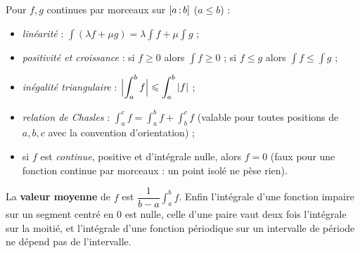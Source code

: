 \begin{theoreme}
Pour $f,g$ continues par morceaux sur $\mathopen{[}a\,{;}\,b\mathclose{]}$ ($a\leqslant b$) :
\begin{itemize}[label={\color{otNavy}\textbullet},leftmargin=1.4em,itemsep=0.6mm,topsep=0.8mm]
  \item \emph{linéarité} :
    $\int(\lambda f+\mu g)=\lambda\int f+\mu\int g$ ;
  \item \emph{positivité et croissance} : si $f\geqslant0$ alors
    $\int f\geqslant0$ ; si $f\leqslant g$ alors
    $\int f\leqslant\int g$ ;
  \item \emph{inégalité triangulaire} :
    $\Bigl|\displaystyle\int_{a}^{b}f\Bigr|\leqslant\displaystyle\int_{a}^{b}|f|$ ;
  \item \emph{relation de Chasles} :
    $\displaystyle\int_{a}^{c}f=\int_{a}^{b}f+\int_{b}^{c}f$ (valable pour
    toutes positions de $a,b,c$ avec la convention d'orientation) ;
  \item si $f$ est \emph{continue}, positive et d'intégrale nulle, alors
    $f=0$ (faux pour une fonction continue par morceaux : un point isolé
    ne pèse rien).
\end{itemize}
La \textbf{valeur moyenne} de $f$ est
$\dfrac{1}{b-a}\displaystyle\int_{a}^{b}f$. Enfin l'intégrale d'une
fonction impaire sur un segment centré en $0$ est nulle, celle d'une paire
vaut deux fois l'intégrale sur la moitié, et l'intégrale d'une fonction
périodique sur un intervalle de période ne dépend pas de l'intervalle.
\end{theoreme}


